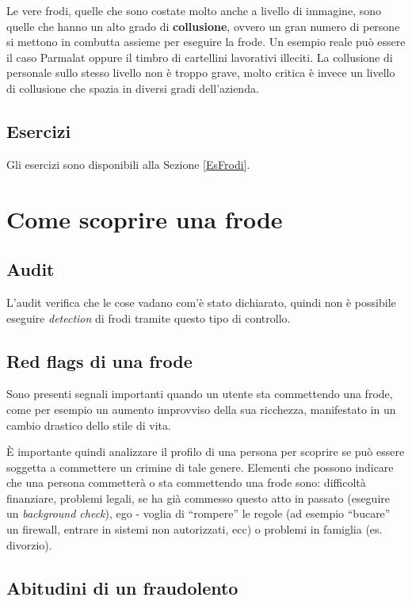 Le vere frodi, quelle che sono costate molto anche a livello di immagine, sono
quelle che hanno un alto grado di \textbf{collusione}, ovvero un gran numero di
persone si mettono in combutta assieme per eseguire la frode. Un esempio 
reale può essere il caso Parmalat oppure il timbro di cartellini lavorativi 
illeciti. La collusione di personale sullo stesso livello non è troppo grave, 
molto critica è invece un livello di collusione che spazia in diversi gradi 
dell'azienda.

\subsection{Esercizi}

Gli esercizi sono disponibili alla Sezione \ref{EsFrodi}.

\section{Come scoprire una frode}

\subsection{Audit}

L'audit verifica che le cose vadano com'è stato dichiarato, quindi non è
possibile eseguire \textit{detection} di frodi tramite questo tipo di controllo.

\subsection{Red flags di una frode}
Sono presenti segnali importanti quando un utente sta commettendo una frode,
come per esempio un aumento improvviso della sua ricchezza, manifestato
in un cambio drastico dello stile di vita.

È importante quindi analizzare il profilo di una persona per scoprire se può
essere soggetta a commettere un crimine di tale genere. Elementi che possono 
indicare che una persona commetterà o sta commettendo una frode sono:
difficoltà finanziare, problemi legali, se ha già commesso questo atto in 
passato (eseguire un \textit{background check}), ego - voglia di ``rompere'' 
le regole (ad esempio ``bucare'' un firewall, entrare in sistemi non 
autorizzati, ecc) o problemi in famiglia (es. divorzio).

\subsection{Abitudini di un fraudolento}

